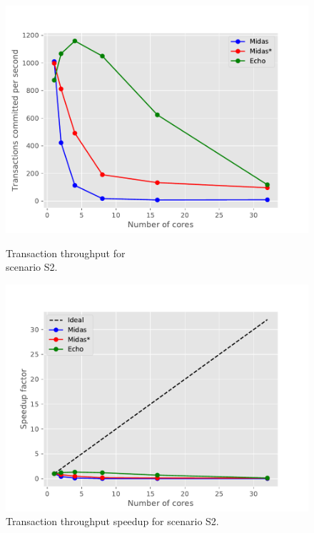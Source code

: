 \begin{figure}[h!]
\begin{minipage}[l]{0.50\textwidth}
    \includegraphics[width=\textwidth]{figures/bench/ttp-sl}
    \caption{Transaction throughput for\\scenario S2.}
    \label{fig:ttp-s2}
\end{minipage}
\begin{minipage}[l]{0.50\textwidth}
    \includegraphics[width=\textwidth]{figures/bench/spd-sl}
    \caption{Transaction throughput speedup for scenario S2.}
    \label{fig:spd-s2}
\end{minipage}
\begin{minipage}[l]{0.50\textwidth}

\end{minipage}
\end{figure}
